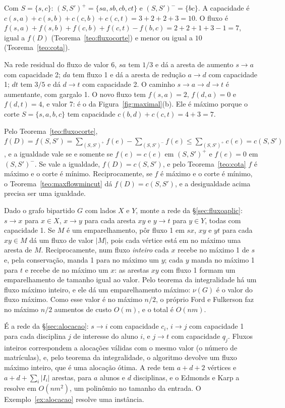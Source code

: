  Com $S=\{s,c\}$: $(S,S')^+=\{sa,sb,cb,ct\}$ e $(S,S')^-=\{bc\}$. A capacidade é $c(s,a)+c(s,b)+c(c,b)+c(c,t)=3+2+2+3=10$. O fluxo é $f(s,a)+f(s,b)+f(c,b)+f(c,t)-f(b,c)=2+2+1+3-1=7$, igual a $f(D)$ (Teorema~\ref{teo:fluxocorte}) e menor ou igual a $10$ (Teorema~\ref{teo:cota}).

 Na rede residual do fluxo de valor 6, $sa$ tem $1/3$ e dá a aresta de aumento $s\to a$ com capacidade 2; $da$ tem fluxo 1 e dá a aresta de redução $a\to d$ com capacidade 1; $dt$ tem $3/5$ e dá $d\to t$ com capacidade 2. O caminho $s\to a\to d\to t$ é aumentante, com gargalo 1. O novo fluxo tem $f(s,a)=2$, $f(d,a)=0$ e $f(d,t)=4$, e valor 7: é o da Figura~\ref{fig:maximal}(b). Ele é máximo porque o corte $S=\{s,a,b,c\}$ tem capacidade $c(b,d)+c(c,t)=4+3=7$.

 Pelo Teorema~\ref{teo:fluxocorte}, $f(D)=f(S,S')=\sum_{(S,S')^+}f(e)-\sum_{(S,S')^-}f(e)\le\sum_{(S,S')^+}c(e)=c(S,S')$, e a igualdade vale se e somente se $f(e)=c(e)$ em $(S,S')^+$ e $f(e)=0$ em $(S,S')^-$. Se vale a igualdade, $f(D)=c(S,S')$, e pelo Teorema~\ref{teo:cota} $f$ é máximo e o corte é mínimo. Reciprocamente, se $f$ é máximo e o corte é mínimo, o Teorema~\ref{teo:maxflowmincut} dá $f(D)=c(S,S')$, e a desigualdade acima precisa ser uma igualdade.

 Dado o grafo bipartido $G$ com lados $X$ e $Y$, monte a rede da §\ref{sec:fluxoaplic}: $s\to x$ para $x\in X$, $x\to y$ para cada aresta $xy$ e $y\to t$ para $y\in Y$, todas com capacidade 1. Se $M$ é um emparelhamento, pôr fluxo 1 em $sx$, $xy$ e $yt$ para cada $xy\in M$ dá um fluxo de valor $|M|$, pois cada vértice está em no máximo uma aresta de $M$. Reciprocamente, num fluxo \emph{inteiro} cada $x$ recebe no máximo 1 de $s$ e, pela conservação, manda 1 para no máximo um $y$; cada $y$ manda no máximo 1 para $t$ e recebe de no máximo um $x$: as arestas $xy$ com fluxo 1 formam um emparelhamento de tamanho igual ao valor. Pelo teorema da integralidade há um fluxo máximo inteiro, e ele dá um emparelhamento máximo: $\nu(G)$ é o valor do fluxo máximo. Como esse valor é no máximo $n/2$, o próprio Ford e Fulkerson faz no máximo $n/2$ aumentos de custo $O(m)$, e o total é $O(nm)$.

 É a rede da §\ref{sec:alocacao}: $s\to i$ com capacidade $c_i$, $i\to j$ com capacidade 1 para cada disciplina $j$ de interesse do aluno $i$, e $j\to t$ com capacidade $q_j$. Fluxos inteiros correspondem a alocações válidas com o mesmo valor (o número de matrículas), e, pelo teorema da integralidade, o algoritmo devolve um fluxo máximo inteiro, que é uma alocação ótima. A rede tem $a+d+2$ vértices e $a+d+\sum_i|I_i|$ arestas, para $a$ alunos e $d$ disciplinas, e o Edmonds e Karp a resolve em $O(nm^2)$, um polinômio no tamanho da entrada. O Exemplo~\ref{ex:alocacao} resolve uma instância.

